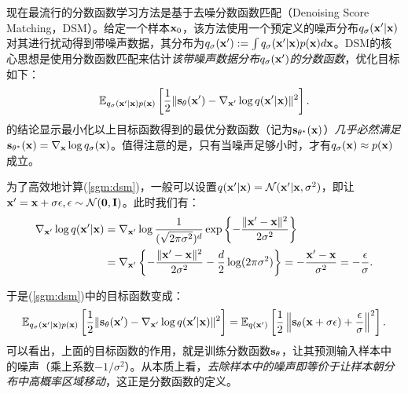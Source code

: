 \documentclass[11pt,a4paper,UTF8]{ctexart}
\begin{document}
现在最流行的分数函数学习方法是基于去噪分数函数匹配（Denoising Score Matching，DSM）\cite{vincent2011connection}。给定一个样本$\mathbf{x}_0$，该方法使用一个预定义的噪声分布$q_\sigma(\mathbf{x}^\prime|\mathbf{x})$对其进行扰动得到带噪声数据，其分布为$q_\sigma(\mathbf{x}^\prime):=\int q_\sigma(\mathbf{x}^\prime|\mathbf{x})p(\mathbf{x})d\mathbf{x}$。DSM的核心思想是使用分数函数匹配来估计\emph{该带噪声数据分布$q_\sigma(\mathbf{x}^\prime)$的分数函数}，优化目标如下：
\begin{equation}
\mathbb{E}_{q_\sigma(\mathbf{x}^\prime|\mathbf{x})p(\mathbf{x})} \left[\frac{1}{2}\| \mathbf{s}_{\theta}(\mathbf{x}^\prime) - \nabla_{\mathbf{x}^\prime}\log q(\mathbf{x}^\prime|\mathbf{x}) \|^2 \right].
\label{sgm:dsm}
\end{equation}
\cite{vincent2011connection}的结论显示最小化以上目标函数得到的最优分数函数（记为$\mathbf{s}_{\theta^*}(\mathbf{x})$）\emph{几乎必然满足}$\mathbf{s}_{\theta^*}(\mathbf{x})=\nabla_{\mathbf{x}}\log q_\sigma(\mathbf{x})$。值得注意的是，只有当噪声足够小时，才有$q_\sigma(\mathbf{x})\approx p(\mathbf{x})$成立。

为了高效地计算(\ref{sgm:dsm})，一般可以设置$q(\mathbf{x}^\prime|\mathbf{x})=\mathcal{N}(\mathbf{x}^\prime|\mathbf{x},\sigma^2)$，即让$\mathbf{x}^\prime=\mathbf{x}+\sigma\epsilon,\epsilon\sim\mathcal{N}(\mathbf{0},\mathbf{I})$。此时我们有：
\begin{align*}
    \nabla_{\mathbf{x}^\prime}\log q(\mathbf{x}^\prime|\mathbf{x}) &= \nabla_{\mathbf{x}^\prime}\log \frac{1}{(\sqrt{2\pi\sigma^2})^d}\exp\left\{-\frac{\|\mathbf{x}^\prime-\mathbf{x} \|^2}{2\sigma^2}\right\} \\
    &= \nabla_{\mathbf{x}^\prime} \left\{ -\frac{\|\mathbf{x}^\prime-\mathbf{x} \|^2}{2\sigma^2} -\frac{d}{2}\log (2\pi\sigma^2) \right\} = -\frac{\mathbf{x}^\prime-\mathbf{x}}{\sigma^2}=-\frac{\epsilon}{\sigma}.
\end{align*}

于是(\ref{sgm:dsm})中的目标函数变成：
\begin{equation}
\mathbb{E}_{q_\sigma(\mathbf{x}^\prime|\mathbf{x})p(\mathbf{x})} \left[\frac{1}{2}\| \mathbf{s}_{\theta}(\mathbf{x}^\prime) - \nabla_{\mathbf{x}^\prime}\log q(\mathbf{x}^\prime|\mathbf{x})  \|^2 \right] = \mathbb{E}_{q(\mathbf{x}^\prime)} \left[ \frac{1}{2}\left\| \mathbf{s}_\theta(\mathbf{x} +\sigma\epsilon)+\frac{\epsilon}{\sigma} \right\|^2\right].
\label{sgm:dsm_obj}
\end{equation}
可以看出，上面的目标函数的作用，就是训练分数函数$\mathbf{s}_\theta$，让其预测输入样本中的噪声（乘上系数$-1/\sigma^2$）。从本质上看，\emph{去除样本中的噪声即等价于让样本朝分布中高概率区域移动}，这正是分数函数的定义。
\end{document}
